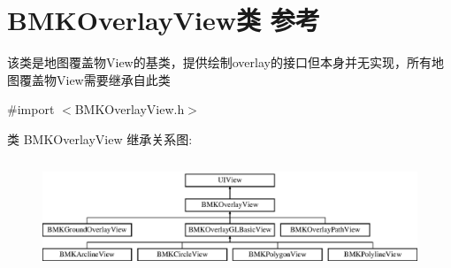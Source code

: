 \hypertarget{interface_b_m_k_overlay_view}{\section{B\+M\+K\+Overlay\+View类 参考}
\label{interface_b_m_k_overlay_view}
}


该类是地图覆盖物\+View的基类，提供绘制overlay的接口但本身并无实现，所有地图覆盖物\+View需要继承自此类  




{\ttfamily \#import $<$B\+M\+K\+Overlay\+View.\+h$>$}

类 B\+M\+K\+Overlay\+View 继承关系图\+:\begin{figure}[H]
\begin{center}
\leavevmode
\includegraphics[height=3.333333cm]{interface_b_m_k_overlay_view}
\end{center}
\end{figure}
